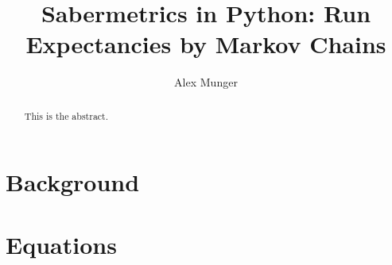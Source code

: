 \documentclass{article}
\title{Sabermetrics in Python: Run Expectancies by Markov Chains}
\author{Alex Munger}
\begin{document}
\maketitle

\begin{abstract}
	This is the abstract.
\end{abstract}

\section{Background}

\section{Equations}
\end{document}
